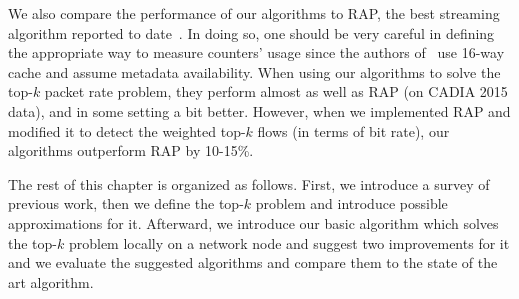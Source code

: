 We also compare the performance of our algorithms to RAP, the best streaming algorithm reported to date~\cite{Ben-Basat2017}. In doing so, one should be very careful in defining the appropriate way to measure counters' usage since the authors of~\cite{Ben-Basat2017} use 16-way cache and assume metadata availability. When using our algorithms to solve the top-$k$ packet rate problem, they perform almost as well as RAP (on CADIA 2015 data), and in some setting a bit better. However, when we implemented RAP and modified it to detect the weighted top-$k$ flows (in terms of bit rate), our algorithms outperform RAP by 10-15\%.



The rest of this chapter is organized as follows. First, we introduce a survey of previous work, then we define the top-$k$ problem and introduce possible approximations for it. Afterward, we introduce our basic algorithm which solves the top-$k$ problem locally on a network node and suggest two improvements for it and we evaluate the suggested algorithms and compare them to the state of the art algorithm.